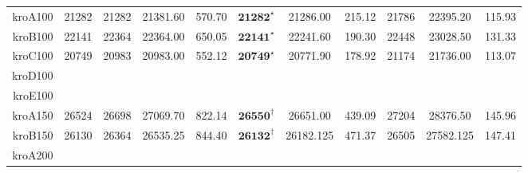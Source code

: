 \documentclass[12pt]{ctexart}
\begin{document}
\begin{table}[htbp]
\begin{tabular}{rcccccccccc}
        kroA100                       & 21282                             & 21282                       & 21381.60                               & 570.70           & $\textbf{21282}^\star$  & 21286.00         & 215.12           & 21786                 & 22395.20         & 115.93           \\
        kroB100                       & 22141                             & 22364                       & 22364.00                               & 650.05           & $\textbf{22141}^\star$  & 22241.60         & 190.30           & 22448                 & 23028.50         & 131.33           \\
        kroC100                       & 20749                             & 20983                       & 20983.00                               & 552.12           & $\textbf{20749}^\star$  & 20771.90         & 178.92           & 21174                 & 21736.00         & 113.07           \\
        kroD100                                                                                                                                                                                                                                                                                   \\
        kroE100                                                                                                                                                                                                                                                                                   \\
        kroA150                       & 26524                             & 26698                       & 27069.70                               & 822.14           & $\textbf{26550}^\dag$   & 26651.00         & 439.09           & 27204                 & 28376.50         & 145.96           \\
        kroB150                       & 26130                             & 26364                       & 26535.25                               & 844.40           & $\textbf{26132}^\dag$   & 26182.125        & 471.37           & 26505                 & 27582.125        & 147.41           \\
        kroA200                                                                                                                                                                                                                                                                                   \\

\end{tabular}
\end{table}
\end{document}
